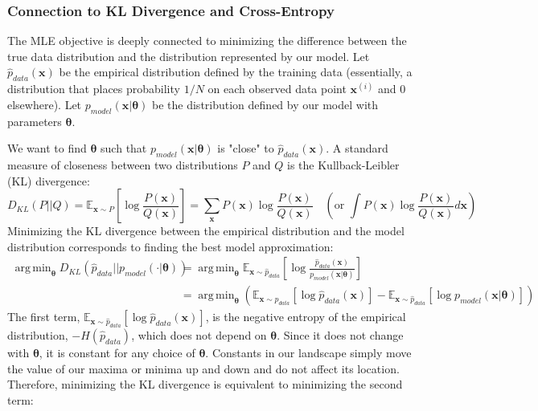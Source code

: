 \documentclass{article}
\DeclareMathOperator*{\argmin}{arg\,min}
\begin{document}
\subsubsection{Connection to KL Divergence and Cross-Entropy}
The MLE objective is deeply connected to minimizing the difference between the true data distribution and the distribution represented by our model. Let $\hat{p}_{data}(\mathbf{x})$ be the empirical distribution defined by the training data (essentially, a distribution that places probability $1/N$ on each observed data point $\mathbf{x}^{(i)}$ and 0 elsewhere). Let $p_{model}(\mathbf{x} | \bm{\theta})$ be the distribution defined by our model with parameters $\bm{\theta}$.

We want to find $\bm{\theta}$ such that $p_{model}(\mathbf{x} | \bm{\theta})$ is "close" to $\hat{p}_{data}(\mathbf{x})$. A standard measure of closeness between two distributions $P$ and $Q$ is the Kullback-Leibler (KL) divergence:
\begin{equation}
    D_{KL}(P || Q) = \mathbb{E}_{\mathbf{x} \sim P} \left[ \log \frac{P(\mathbf{x})}{Q(\mathbf{x})} \right] = \sum_{\mathbf{x}} P(\mathbf{x}) \log \frac{P(\mathbf{x})}{Q(\mathbf{x})} \quad (\text{or } \int P(\mathbf{x}) \log \frac{P(\mathbf{x})}{Q(\mathbf{x})} d\mathbf{x})
\end{equation}
Minimizing the KL divergence between the empirical distribution and the model distribution corresponds to finding the best model approximation:
\begin{align}
    \argmin_{\bm{\theta}} D_{KL}(\hat{p}_{data} || p_{model}(\cdot | \bm{\theta})) &= \argmin_{\bm{\theta}} \mathbb{E}_{\mathbf{x} \sim \hat{p}_{data}} \left[ \log \frac{\hat{p}_{data}(\mathbf{x})}{p_{model}(\mathbf{x} | \bm{\theta})} \right] \\
    &= \argmin_{\bm{\theta}} \left( \mathbb{E}_{\mathbf{x} \sim \hat{p}_{data}} [\log \hat{p}_{data}(\mathbf{x})] - \mathbb{E}_{\mathbf{x} \sim \hat{p}_{data}} [\log p_{model}(\mathbf{x} | \bm{\theta})] \right)
\end{align}
The first term, $\mathbb{E}_{\mathbf{x} \sim \hat{p}_{data}} [\log \hat{p}_{data}(\mathbf{x})]$, is the negative entropy of the empirical distribution, $-H(\hat{p}_{data})$, which does not depend on $\bm{\theta}$. Since it does not change with $\bm{\theta}$, it is constant for any choice of $\bm{\theta}$. Constants in our landscape simply move the value of our maxima or minima up and down and do not affect its location. Therefore, minimizing the KL divergence is equivalent to minimizing the second term:
\end{document}
